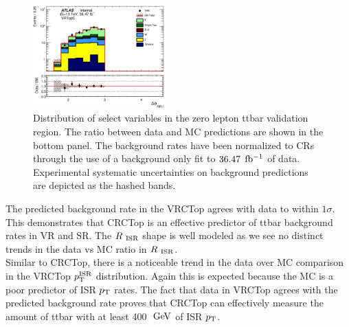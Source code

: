 \begin{figure}[htbp]
        \includegraphics[width=0.45\textwidth]{figures/ttbar/postfit/CA_dphiISRI_VRTopC_log}
  \caption{\label{fig:ttbar0Lep1bVRISR}{Distribution of select variables in the zero lepton ttbar validation region.  The ratio between data and MC predictions are shown in the bottom panel.  The background rates have been normalized to CRs through the use of a background only fit to $36.47$ $\mbox{fb$^{-1}$}$ of data.  Experimental systematic uncertainties on background predictions are depicted as the hashed bands. }}
\end{figure}

\indent The predicted background rate in the VRCTop agrees with data to within $1\sigma$.  This demonstrates that CRCTop is an effective predictor of ttbar background rates in VR and SR.  The $R_{~\mathrm{ISR}}$ shape is well modeled as we see no distinct trends in the data vs MC ratio in $R_{~\mathrm{ISR}}$. \\

\indent Similar to CRCTop, there is a noticeable trend in the data over MC comparison in the VRCTop $p_{\mathrm{T}}^{\mathrm{ISR}}$ distribution.  Again this is expected because the MC is a poor predictor of ISR $p_{\mathrm{T}}$ rates.  The fact that data in VRCTop agrees with the predicted background rate proves that CRCTop can effectively measure the amount of ttbar with at least 400 $\gev$ of ISR $p_{\mathrm{T}}$.  \\

